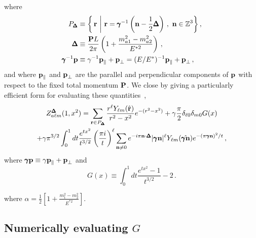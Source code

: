 where 
\begin{align}
P_{\pmb \Delta} & \equiv  \bigg \{  \, \textbf r \ \bigg \vert \ \textbf r =   \pmb \gamma^{-1}\left( \textbf n - \frac12 \pmb \Delta \right) \,, \ \textbf n \in \mathbb Z^3 \bigg \} \,, \\
\pmb \Delta & \equiv \frac{\textbf P L}{2 \pi} \left (1 + \frac{m_{a1}^2 - m_{a2}^2}{E^{*2}} \right) \,, \\
\pmb \gamma^{-1} \textbf p & \equiv \gamma^{-1} \textbf p_{\parallel} + \textbf p_{\bot} = (E/E^*)^{-1} \textbf p_{\parallel} + \textbf p_{\bot}  \,,
\end{align}
and where $\textbf p_{\parallel}$ and $\textbf p_{\bot}$ are the parallel and perpendicular components of $\textbf p$ with respect to the fixed total momentum $\textbf P$. We close by giving a particularly efficient form for evaluating these quantities~\cite{Leskovec:2012gb},
\begin{multline}
Z_{a\ell m}^{\pmb \Delta}(1,x^2) = \sum_{\textbf r \in P_{\pmb \Delta}} \frac{ r^\ell  Y_{\ell m}(\hat {\textbf r})}{ r^2 - x^2} e^{-( r^2 - x^2)} + \gamma \frac{\pi}{2} \delta_{\ell 0} \delta_{m0} G(x) \\
+ \gamma \pi^{3/2} \int_0^1 dt \frac{e^{tx^2}}{t^{3/2}} \left( \frac{\pi i}{t} \right)^{\ell} \sum_{\textbf n \neq 0} e^{-i \pi \textbf n \cdot \pmb \Delta} \vert \pmb \gamma \textbf n \vert ^{\ell}  Y_{\ell m}( \hat {\pmb \gamma \textbf n}) e^{-(\pi \pmb \gamma \textbf n)^2/t} \,,
\end{multline}
where $\pmb \gamma \textbf p  \equiv \gamma \textbf p_{\parallel} + \textbf p_{\bot}$ and
\begin{equation}
G(x)  \equiv \int_0^1 dt \frac{e^{t x^2} - 1}{t^{3/2}}   - 2  \,.
\end{equation}

where $\alpha=\frac{1}{2}\left[1+\frac{m_1^2-m_2^2}{E^{*2}}\right]$.

{}

{}

{}



 \subsection{Numerically evaluating $G$}


